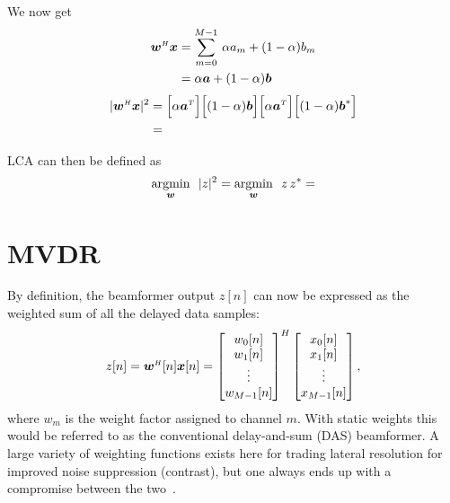 We now get 
%
\begin{align}
\boldsymbol{w}^{\scriptscriptstyle H}\boldsymbol{x} &= \sum\limits_{m=0}^{M-1}\, \alpha a_m + (1-\alpha)b_m \nonumber\\
&= \alpha \boldsymbol{a} + (1-\alpha)\boldsymbol{b}
\end{align}
%
\begin{align}
|\boldsymbol{w}^{\scriptscriptstyle H}\boldsymbol{x}|^2 &= \Big[\alpha \boldsymbol{a}^{\scriptscriptstyle T}\Big]\Big[(1-\alpha)\boldsymbol{b}\Big]\Big[\alpha \boldsymbol{a}^{\scriptscriptstyle T}\Big] \Big[(1-\alpha)\boldsymbol{b}^*\Big] \nonumber\\
&= 
\end{align}
%


LCA can then be defined as
%
\begin{align}
\argmin{\w}\ |z|^2 = \argmin{\w}\ z\,z^* = %
\end{align}

\newpage
\section{MVDR}

By definition, the beamformer output $z[n]$ can now be expressed as the weighted sum of all the delayed data samples:
\begin{align}
z[n] = \boldsymbol{w}^{\scriptscriptstyle H}[n]\boldsymbol{x}[n] = \begin{bmatrix}w_0[n]\\w_1[n]\\\vdots\\w_{M-1}[n]\end{bmatrix}^H \begin{bmatrix}x_0[n]\\x_1[n]\\\vdots\\x_{M-1}[n]\end{bmatrix},\label{z}
\end{align}
where $w_m$ is the weight factor assigned to channel $m$. With static weights this would be referred to as the conventional delay-and-sum (DAS) beamformer. A large variety of weighting functions exists here for trading lateral resolution for improved noise suppression (contrast), but one always ends up with a compromise between the two~\cite{Harris1978}.

